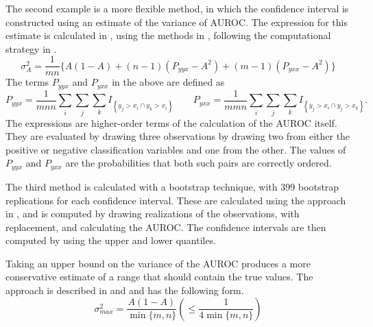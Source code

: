 The second example is a more flexible method, in which the confidence interval is constructed using an estimate of the variance of AUROC.
The expression for this estimate is calculated in \citet{hanleymcneil1982}, using the methods in \citet{proc2011}, following the computational strategy in \citet{sunxu2014}.
%
\begin{equation}
    \sigma^2_A = \frac{1}{mn} \{ A(1 - A) + (n - 1)(P_{yyx} - A^2) + (m - 1)(P_{yxx} - A^2) \}
\end{equation}
%
The terms $P_{yyx}$ and $P_{yxx}$ in the above are defined as
%
\begin{equation}
    P_{yyx} = \frac{1}{mnn} \sum_i \sum_j \sum_k I_{\left\{ y_j > x_i \cap y_k > x_i \right\}}
    \qquad
    P_{yxx} = \frac{1}{mmn} \sum_i \sum_j \sum_k I_{\left\{ y_j > x_i \cap y_j > x_k \right\}}.
\end{equation}
%
The expressions are higher-order terms of the calculation of the AUROC itself.
They are evaluated by drawing three observations by drawing two from either the positive or negative classification variables and one from the other.
The values of $P_{yyx}$ and $P_{yxx}$ are the probabilities that both such pairs are correctly ordered.

The third method is calculated with a bootstrap technique, with $399$ bootstrap replications for each confidence interval.
These are calculated using the approach in \citet{proc2011}, and is computed by drawing realizations of the observations, with replacement, and calculating the AUROC.
The confidence intervals are then computed by using the upper and lower quantiles.

Taking an upper bound on the variance of the AUROC produces a more conservative estimate of a range that should contain the true values.
The approach is described in \citet{birn1957} and \citet{vandan1915} and has the following form.
%
\begin{equation}
    \sigma^2_{max} = \frac{A(1-A)}{\min\{ m, n \}}
    \left( \leq \frac{1}{4 \min\{ m, n \} } \right)
\end{equation}
%






